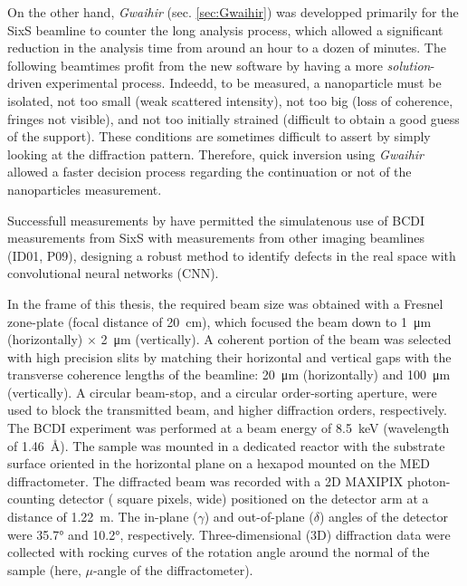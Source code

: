 On the other hand, \textit{Gwaihir} (sec. \ref{sec:Gwaihir}) was developped primarily for the SixS beamline to counter the long analysis process, which allowed a significant reduction in the analysis time from around an hour to a dozen of minutes.
The following beamtimes profit from the new software by having a more \textit{solution}-driven experimental process.
Indeedd, to be measured, a nanoparticle must be isolated, not too small (weak scattered intensity), not too big (loss of coherence, fringes not visible), and not too initially strained (difficult to obtain a good guess of the support).
These conditions are sometimes difficult to assert by simply looking at the diffraction pattern.
Therefore, quick inversion using \textit{Gwaihir} allowed a faster decision process regarding the continuation or not of the nanoparticles measurement.

Successfull measurements by \cite{Lim2021} have permitted the simulatenous use of BCDI measurements from SixS with measurements from other imaging beamlines (ID01, P09), designing a robust method to identify defects in the real space with convolutional neural networks (CNN).

In the frame of this thesis, the required beam size was obtained with a Fresnel zone-plate (focal distance of \qty{20}{\cm}), which focused the beam down to \qty{1}{\um} (horizontally) $\times$ \qty{2}{\um} (vertically).
A coherent portion of the beam was selected with high precision slits by matching their horizontal and vertical gaps with the transverse coherence lengths of the beamline: \qty{20}{\um} (horizontally) and \qty{100}{\um} (vertically).
A circular beam-stop, and a circular order-sorting aperture, were used to block the transmitted beam, and higher diffraction orders, respectively.
The BCDI experiment was performed at a beam energy of \qty{8.5}{\keV} (wavelength of \qty{1.46}{\angstrom}). The sample was mounted in a dedicated reactor with the substrate surface oriented in the horizontal plane on a hexapod mounted on the MED diffractometer.
The diffracted beam was recorded with a 2D MAXIPIX photon-counting detector ( square pixels,  wide) positioned on the detector arm at a distance of \qty{1.22}{\meter}.
The in-plane ($\gamma$) and out-of-plane ($\delta$) angles of the detector were \ang{35.7} and \ang{10.2}, respectively.
Three-dimensional (3D) diffraction data were collected with rocking curves of the rotation angle around the normal of the sample (here, $\mu$-angle of the diffractometer).

